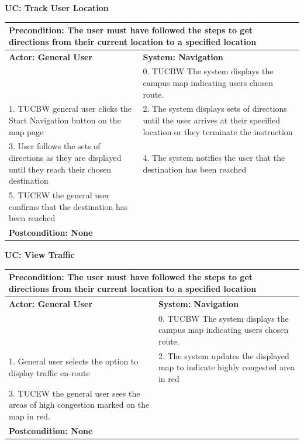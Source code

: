 \documentclass{article}
\begin{document}
{\begin{flushleft}
\begin{tabular}{  |p{7cm}|p{7cm}| }
\end{tabular}
\end{flushleft}
	
\noindent\textbf{UC: Track User Location}
\begin{flushleft}
\begin{tabular}{ |p{7cm}|p{7cm}| }
  \hline
  \multicolumn{2}{|p{\textwidth}|}{\textbf{Precondition:} The user must have followed the steps to get directions from their current location to a specified location} \\
  \hline
  \textbf{Actor: General User}  & \textbf{System: Navigation} \\
   \hline
   & 0. TUCBW The system displays the campus map indicating users chosen route. \\
  \hline
  1. TUCBW general user clicks the Start Navigation button on the map page& 2. The system displays sets of directions until the user arrives at their specified location or they terminate the instruction\\
  \hline
  3. User follows the sets of directions as they are displayed until they reach their chosen destination& 4. The system notifies the user that the destination has been reached\\
  \hline
  5. TUCEW the general user confirms that the destination has been reached& \\
  \hline
  \multicolumn{2}{|p{\textwidth}|}{\textbf{Postcondition: None}} \\
   \hline
\end{tabular}
\end{flushleft}

\bigskip
\bigskip

\noindent\textbf{UC: View Traffic}
\begin{flushleft}
\begin{tabular}{ |p{7cm}|p{7cm}| }
  \hline
  \multicolumn{2}{|p{\textwidth}|}{\textbf{Precondition:} The user must have followed the steps to get directions from their current location to a specified location} \\
  \hline
  \textbf{Actor: General User}  & \textbf{System: Navigation} \\
   \hline
   & 0. TUCBW The system displays the campus map indicating users chosen route. \\
  \hline
  1. General user selects the option to display traffic en-route & 2. The system updates the displayed map to indicate highly congested area in red\\
  \hline
  3. TUCEW the general user sees the areas of high congestion marked on the map in red.&\\
  \hline
  \multicolumn{2}{|p{\textwidth}|}{\textbf{Postcondition: None}} \\
   \hline
\end{tabular}
\end{flushleft}
}
\end{document}
